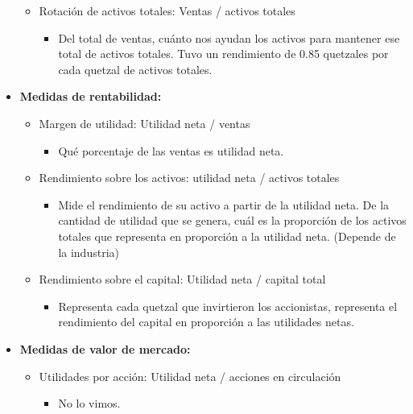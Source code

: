 \documentclass{article}
\begin{document}
\begin{itemize}
\begin{itemize}
            \item Rotación de activos totales: Ventas / activos totales 
                \begin{itemize}
                    \item Del total de ventas, cuánto nos ayudan los activos para mantener ese total de activos totales. Tuvo un rendimiento de 0.85 quetzales por cada quetzal de activos totales. 
                \end{itemize}
        \end{itemize}
        
    \item \large\textbf{Medidas de rentabilidad:}\normalsize
        \begin{itemize}
            \item Margen de utilidad: Utilidad neta / ventas
                \begin{itemize}
                    \item Qué porcentaje de las ventas es utilidad neta. 
                \end{itemize}
                
            \item Rendimiento sobre los activos: utilidad neta / activos totales 
                \begin{itemize}
                    \item Mide el rendimiento de su activo a partir de la utilidad neta. De la cantidad de utilidad que se genera, cuál es la proporción de los activos totales que representa en proporción a la utilidad neta. (Depende de la industria)
                \end{itemize}
                
            \item Rendimiento sobre el capital: Utilidad neta / capital total
                \begin{itemize}
                    \item Representa cada quetzal que invirtieron los accionistas, representa el rendimiento del capital en proporción a las utilidades netas. 
                \end{itemize}
        \end{itemize}

    \item \large\textbf{Medidas de valor de mercado:}\normalsize
        \begin{itemize}
            \item Utilidades por acción: Utilidad neta / acciones en circulación
                \begin{itemize}
                    \item No lo vimos. 
                \end{itemize}
                

\end{itemize}
\end{itemize}
\end{document}
